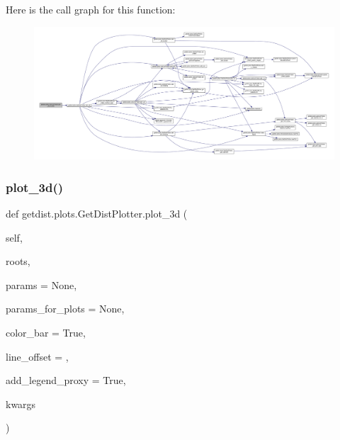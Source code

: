 Here is the call graph for this function\+:
\nopagebreak
\begin{figure}[H]
\begin{center}
\leavevmode
\includegraphics[width=350pt]{classgetdist_1_1plots_1_1GetDistPlotter_a20064a0721aea40476598a5a3a20df01_cgraph}
\end{center}
\end{figure}
\mbox{\label{classgetdist_1_1plots_1_1GetDistPlotter_a47d2f31e3d3cb751152be571a867a503}} 
\subsubsection{\texorpdfstring{plot\+\_\+3d()}{plot\_3d()}}
{\footnotesize\ttfamily def getdist.\+plots.\+Get\+Dist\+Plotter.\+plot\+\_\+3d (\begin{DoxyParamCaption}\item[{}]{self,  }\item[{}]{roots,  }\item[{}]{params = {\ttfamily None},  }\item[{}]{params\+\_\+for\+\_\+plots = {\ttfamily None},  }\item[{}]{color\+\_\+bar = {\ttfamily True},  }\item[{}]{line\+\_\+offset = {},  }\item[{}]{add\+\_\+legend\+\_\+proxy = {\ttfamily True},  }\item[{}]{kwargs }\end{DoxyParamCaption})}

